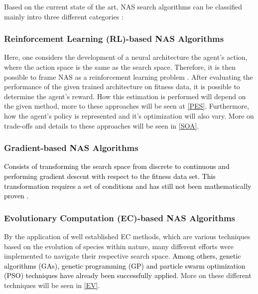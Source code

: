 \documentclass[10pt,        %
               a4paper,     %
               journal,     %
               ]{IEEEtran}
\begin{document}
Based on the current state of the art, NAS search algorithms can be classified mainly intro three different
categories \cite{liu2021survey}:

\subsubsection{\textbf{Reinforcement Learning} (RL)-based NAS Algorithms}
Here, one considers the development of a neural architecture the agent's action, where the action space is the same as
the search space. Therefore, it is then possible to frame NAS as a reinforcement learning problem \cite{elsken2019neural}.
After evaluating the performance of the given trained architecture on fitness data, it is possible to
determine the agent's reward. How this estimation is performed will depend on the given method, more to these
approaches will be seen at \ref{PES}. Furthermore, how the agent's policy is represented and it's optimization will
also vary. More on trade-offs and details to these approaches will be seen in \ref{SOA}.

\subsubsection{\textbf{Gradient}-based NAS Algorithms}
\textcolor{black}{
Consists of transforming the search space from discrete to continuous and performing
gradient descent with respect to the fitness data set. This transformation requires a set of conditions
and has still not been mathematically proven \cite{liu2021survey}.
}

\subsubsection{\textbf{Evolutionary Computation} (EC)-based NAS Algorithms}
By the application of well established EC methods, which are various techniques based on the evolution of
species within nature, many different efforts were implemented to navigate their respective search space.
\textcolor{black}{
Among others, genetic algorithms (GAs), genetic programming (GP) and particle swarm optimization (PSO)
techniques have already been successfully applied.
}
More on these different techniques will be seen in \ref{EV}.
\end{document}
